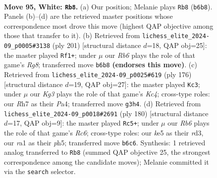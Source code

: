 \documentclass[11pt]{article}
\begin{document}
\clearpage

\begin{figure}[p]\centering
\begin{subfigure}{0.46\textwidth}\centering
\resizebox{\linewidth}{!}{%
\newchessgame
\chessboard[
  setfen={8/7R/1R2pp2/4k3/4P3/5PK1/8/r7 w - - 2 95},
  showmover=false,
  pgfstyle=straightmove, color=movearrow, markmove={b6-b8}
]}
\caption{}
\end{subfigure}\hfill
\begin{subfigure}{0.46\textwidth}\centering
\resizebox{\linewidth}{!}{%
\newchessgame
\chessboard[
  setfen={8/7R/6pP/3k2P1/4pK2/8/8/6r1 b - - 2 101},
  showmover=false,
  pgfstyle=straightmove, color=movearrow, markmove={g1-f1}
]}
\caption{}
\end{subfigure}
\\[4pt]
\begin{subfigure}{0.46\textwidth}\centering
\resizebox{\linewidth}{!}{%
\newchessgame
\chessboard[
  setfen={8/7p/p5kP/4R3/PPK5/8/3rp3/8 w - - 0 89},
  showmover=false,
  pgfstyle=straightmove, color=movearrow, markmove={c4-c3}
]}
\caption{}
\end{subfigure}\hfill
\begin{subfigure}{0.46\textwidth}\centering
\resizebox{\linewidth}{!}{%
\newchessgame
\chessboard[
  setfen={8/8/2R3p1/5k1p/4p2P/3r2P1/6K1/8 w - - 44 91},
  showmover=false,
  pgfstyle=straightmove, color=movearrow, markmove={c6-c5}
]}
\caption{}
\end{subfigure}
\caption{\textbf{Move 95, White: \texttt{Rb8}.} (a) Our position; Melanie plays \texttt{Rb8} (\texttt{b6b8}). Panels (b)--(d) are the retrieved master positions whose correspondence most drove this move (highest QAP objective among those that transfer to it). (b) Retrieved from \texttt{lichess\_elite\_2024-09\_p0005\#3138} (ply 201) [structural distance $d$=18, QAP obj=25]: the master played \texttt{Rf1+}; under $\mu$ our \emph{Rb6} plays the role of that game's \emph{Rg8}; transferred move \texttt{b6b8} \textbf{(endorses this move)}. (c) Retrieved from \texttt{lichess\_elite\_2024-09\_p0025\#619} (ply 176) [structural distance $d$=19, QAP obj=27]: the master played \texttt{Kc3}; under $\mu$ our \emph{Kg3} plays the role of that game's \emph{Kc4}; cross-type roles: our \emph{R}h7 as their \emph{P}a4; transferred move \texttt{g3h4}. (d) Retrieved from \texttt{lichess\_elite\_2024-09\_p0018\#2691} (ply 180) [structural distance $d$=17, QAP obj=9]: the master played \texttt{Rc5+}; under $\mu$ our \emph{Rb6} plays the role of that game's \emph{Rc6}; cross-type roles: our \emph{k}e5 as their \emph{r}d3, our \emph{r}a1 as their \emph{p}h5; transferred move \texttt{b6c6}. Synthesis: 1 retrieved analog transferred to \texttt{Rb8} (summed QAP objective 25, the strongest correspondence among the candidate moves); Melanie committed it via the \texttt{search} selector.}
\label{fig:thought-m188}
\end{figure}
\end{document}

